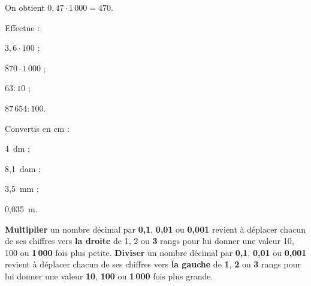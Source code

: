 \begin{methode*1}
\begin{exemple*1}
\begin{minipage}{.55\linewidth}
On obtient $0,47 \cdot 1\,000 = 470$. 
\end{minipage}
\end{exemple*1}

\exercice

Effectue : 
\begin{colenumerate}{4}
 \item $3,6 \cdot 100$ ;
 \item $870 \cdot 1\,000$ ;
 \item $63 : 10$ ;
 \item $87\,654 : 100$.
 \end{colenumerate}
 
\exercice

Convertis en cm :
\begin{colenumerate}{4}
 \item 4 dm ;
 \item 8,1 dam ;
 \item 3,5 mm ;
 \item 0,035 m.
 \end{colenumerate}

\end{methode*1}


\begin{aconnaitre}
\textbf{Multiplier} un nombre décimal par \textcolor{A1}{\textbf{0,1}}, \textcolor{B1}{\textbf{0,01}} ou \textcolor{J1}{\textbf{0,001}} revient à déplacer chacun de ses chiffres vers \textbf{la droite} de 1, 2 ou \textcolor{J1}{\textbf{3}} rangs pour lui donner une valeur 10, 100 ou \textcolor{J1}{\textbf{1\,000}} fois plus petite.
\textbf{Diviser} un nombre décimal par \textcolor{A1}{\textbf{0,1}}, \textcolor{B1}{\textbf{0,01}} ou \textcolor{J1}{\textbf{0,001}} revient à déplacer chacun de ses chiffres vers \textbf{la gauche} de \textcolor{A1}{\textbf{1}}, \textcolor{B1}{\textbf{2}} ou \textcolor{J1}{\textbf{3}} rangs pour lui donner une valeur \textcolor{A1}{\textbf{10}}, \textcolor{B1}{\textbf{100}} ou \textcolor{J1}{\textbf{1\,000}} fois plus grande.
\end{aconnaitre}


